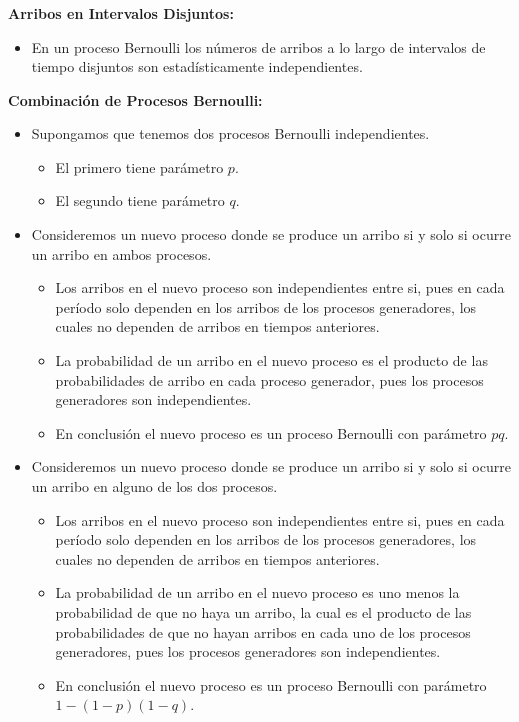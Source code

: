 \documentclass[ 10pt, xcolor = dvipsnames]{beamer}
\begin{document}
\begin{frame}[allowframebreaks]
\frametitle{\insertsection}

\textbf{Arribos en Intervalos Disjuntos:}
\begin{itemize}
\item En un proceso Bernoulli los n\'umeros de arribos a lo largo de intervalos de tiempo disjuntos son estad\'isticamente independientes. 
\end{itemize}
\fullskip

\textbf{Combinaci\'on de Procesos Bernoulli:}
\begin{itemize}
\item Supongamos que tenemos dos procesos Bernoulli independientes. 
\begin{itemize}
\item El primero tiene par\'ametro $p$. 
\item El segundo tiene par\'ametro $q$. 
\end{itemize}
\item Consideremos un nuevo proceso donde se produce un arribo si y solo si \linebreak ocurre un arribo en ambos procesos. 
\begin{itemize}
\item Los arribos en el nuevo proceso son independientes entre si, pues en cada per\'iodo solo dependen en los arribos de los procesos generadores, los cuales \linebreak no dependen de arribos en tiempos anteriores. 
\framebreak
\item La probabilidad de un arribo en el nuevo proceso es el producto de las probabilidades de arribo en cada proceso generador, pues los procesos generadores son independientes. 
\item En conclusi\'on el nuevo proceso es un proceso Bernoulli con par\'ametro $pq$. 
\end{itemize}
\item Consideremos un nuevo proceso donde se produce un arribo si y solo si \linebreak ocurre un arribo en alguno de los dos procesos. 
\begin{itemize}
\item Los arribos en el nuevo proceso son independientes entre si, pues en cada per\'iodo solo dependen en los arribos de los procesos generadores, los cuales \linebreak no dependen de arribos en tiempos anteriores. 
\item La probabilidad de un arribo en el nuevo proceso es uno menos la probabilidad de que no haya un arribo, la cual es el producto de las probabilidades de que no hayan arribos en cada uno de los procesos generadores, pues los procesos generadores son independientes. 
\item En conclusi\'on el nuevo proceso es un proceso Bernoulli con par\'ametro $1 - (1-p)(1-q)$. 
\end{itemize}

\end{itemize}

\end{frame}
\end{document}
